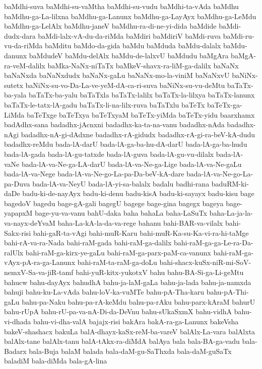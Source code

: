 {baMdhi-suva
baMdhi-su-vaMtha
baMdhi-su-vudu
baMdhi-ta-vAda
baMdhu
baMdhu-ga-La-lilxna
baMdhu-ga-Lanunx
baMdhu-ga-LayAyx
baMdhu-ga-LeMdu
baMdhu-ga-LelAlx
baMdhu-janeV
baMdhu-ra-di-ne-yi-dida
baMdide
baMdi-dudx-dara
baMdi-lalx-vA-du-da-riMda
baMdiri
baMdiriV
baMdi-ruva
baMdi-ru-vu-da-riMda
baMditu
baMdo-da-gida
baMdu
baMduda
baMdu-dalalx
baMdu-danunx
baMdudeV
baMdu-delAlx
baMdu-de-lalxvU
baMdudu
baMgAra
baMgA-ra-veM-dalilx
baMka-NaNx-niTaTx
baMkeV-shavx-ra-liM-ga-dalilx
baNaNx
baNaNxda
baNaNxdudx
baNaNx-gaLu
baNaNx-mo-la-viniM
baNaNxvU
baNiNx-sutetx
baNiNx-su-vo-Da-La-ve-yeM-dA-ca-ri-suva
baNiNx-su-vu-deMtu
baTaTx-ba-yala
baTaTx-ba-yalu
baTaTxla
baTaTx-lalilx
baTaTx-la-lilxya
baTaTx-lanunx
baTaTx-le-tatx-lA-gadu
baTaTx-li-na-lilx-ruva
baTaTxlu
baTeTx
baTeTx-ga-LiMda
baTeTxge
baTeTxya
baTeTxyaM
baTeTx-yiMda
baTeTx-yidu
baarxhamx
badAdhx-sana
badadhx-jAcnxni
badadhx-ka-ta-na-vanu
badadhx-nAda
badadhx-nAgi
badadhx-nA-gi-dAdxne
badadhx-rA-gidudx
badadhx-rA-gi-ra-beV-kA-dudu
badadhx-reMdu
bada-lA-darU
bada-lA-ga-ba-hu-dA-darU
bada-lA-ga-ba-hudu
bada-lA-gada
bada-lA-gu-tatxde
bada-lA-guva
bada-lA-gu-vu-dilalx
bada-lA-vaNe
bada-lA-va-Ne-ga-LA-darU
bada-lA-va-Ne-ga-Lige
bada-lA-va-Ne-gaLu
bada-lA-va-Nege
bada-lA-va-Ne-go-La-pa-Da-beV-kA-dare
bada-lA-va-Ne-go-La-pa-Duva
bada-lA-va-NeyU
bada-lA-yi-sa-balalx
badalu
badhi-rana
baduRM-ki-daDe
badu-ki-de-nayAyx
badu-ki-denu
badu-kisA
badu-ki-sayayx
badu-kisu
bage
bagedoV
bagedu
bage-gA-gali
bagegU
bagege
bage-gina
bagegx
bageya
bage-yapapxM
bage-yu-va-vanu
bahU-daka
baha
bahaLa
baha-LaSuTx
baha-La-ja-la-va-nayx-deYvaM
baha-La-kA-la-da-va-rege
bahanu
bahi-BAR-va-vilalx
bahi-Sakx-risi
bahi-gaR-ta-vAgi
bahi-muR-Karu
bahi-muR-Ka-su-Ka-vi-ra-hi-taMge
bahi-rA-va-ra-Nada
bahi-raM-gada
bahi-raM-ga-dalilx
bahi-raM-ga-ga-Le-ra-Da-ralUlx
bahi-raM-ga-kirx-ye-gaLu
bahi-raM-ga-parx-paM-ca-vanunx
bahi-raM-ga-vAyx-pA-ra-ga-Lanunx
bahi-raM-ta-raM-ga-doLu
bahi-shacx-kuSx-niR-mi-SoV-nemxV-Sa-va-jiR-tamf
bahi-yuR-kitx-yukotxV
bahu
bahu-BA-Si-ga-Li-geMtu
bahucw
bahu-dayAyx
bahudhA
bahu-ja-laM-gaLa
bahu-ja-lada
bahu-ja-namxda
bahuji
bahu-ku-La-vAda
bahu-loV-ka-vuMTe
bahu-pA-Tha-karu
bahu-pA-Thi-gaLu
bahu-pa-Naku
bahu-pa-rA-keMdu
bahu-pa-rAku
bahu-parx-kAraM
bahurU
bahu-rUpA
bahu-rU-pa-va-nA-Di-da-DeVnu
bahu-sUkaSxmX
bahu-vidhA
bahu-vi-dhada
bahu-vi-dha-valA
bajajx-risi
bakAra
bakA-ra-ga-Lanunx
bakeVsha
bakeV-shashacx
bakuLa
balA-dhayx-kaSx-reM-ba-vareV
balAlx-La-vara
balAlxta
balAlx-tane
balAlx-tanu
balA-tAkx-ra-diMdA
balAya
bala
bala-BA-ga-vadu
bala-Badarx
bala-Buja
balaM
balada
bala-daM-gu-SaThxda
bala-daM-guSaTx
baladiM
bala-diMda
bala-gA-lina
}
